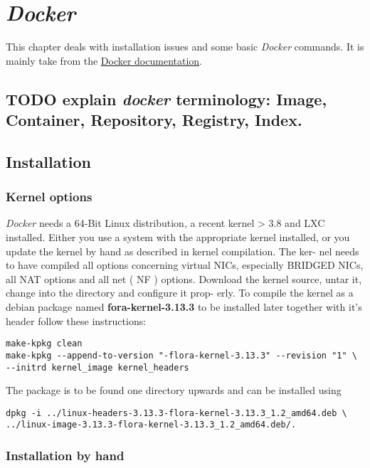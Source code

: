 \documentclass[11pt]{article}
\begin{document}
\section{\emph{Docker}}
\label{sec-2}

This chapter deals with installation issues and some basic \emph{Docker} commands. It is mainly take from the \href{http://docs.docer.io/en/latest/}{Docker documentation}. 
\subsection{\textbf{TODO} explain \emph{docker} terminology: Image, Container, Repository, Registry, Index.}
\label{sec-2-1}
\subsection{Installation}
\label{sec-2-2}
\subsubsection{Kernel options}
\label{sec-2-2-1}

\emph{Docker} needs a 64-Bit Linux distribution, a recent kernel > 3.8 and LXC
installed. Either you use a system with the appropriate kernel installed, or
you update the kernel by hand as described in kernel compilation. The ker-
nel needs to have compiled all options concerning virtual NICs, especially
BRIDGED NICs, all NAT options and all net  ( NF ) options. Download
the kernel source, untar it, change into the directory and configure it prop-
erly. To compile the kernel as a debian package named \textbf{fora-kernel-3.13.3}
to be installed later together with it's header follow these instructions:

\begin{verbatim}
make-kpkg clean
make-kpkg --append-to-version "-flora-kernel-3.13.3" --revision "1" \
--initrd kernel_image kernel_headers
\end{verbatim}
The package is to be found one directory upwards and can be installed using

\begin{verbatim}
dpkg -i ../linux-headers-3.13.3-flora-kernel-3.13.3_1.2_amd64.deb \
../linux-image-3.13.3-flora-kernel-3.13.3_1.2_amd64.deb/.
\end{verbatim}
\subsubsection{Installation by hand}
\label{sec-2-2-2}
\end{document}
